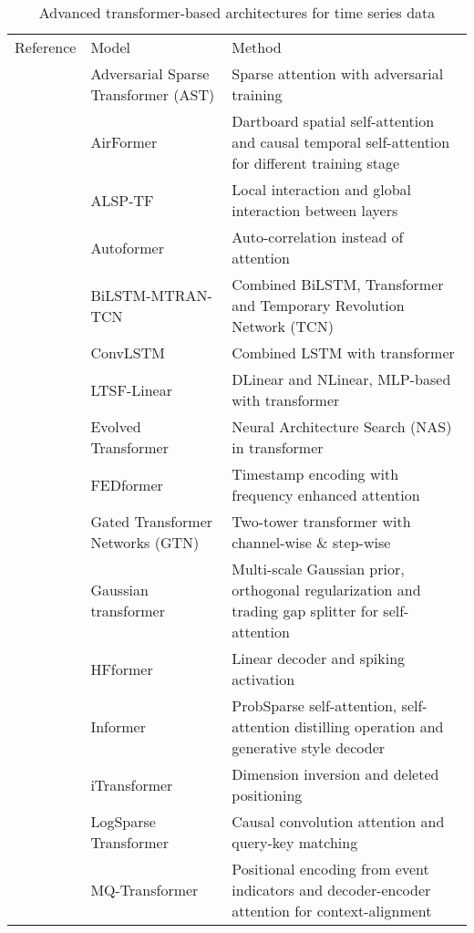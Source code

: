 \documentclass[preprint,12pt]{elsarticle}
\begin{document}
\begin{table}
\scriptsize
\caption{Advanced transformer-based architectures for time series data}
\centering
\label{transformerints}
{
\renewcommand{\arraystretch}{1}
\begin{tabular}{p{2.6cm} | p{4cm} p{7.5cm}}
\toprule
Reference & Model & Method\\
\citet{wu2020adversarial} & Adversarial Sparse Transformer (AST)  &  Sparse attention with adversarial training \\
\citet{liang2023airformer} & AirFormer  & Dartboard spatial self-attention and causal temporal self-attention for different training stage \\ 
\citet{wang2022adaptive} & ALSP-TF & Local interaction and global interaction between layers\\
\citet{wu2021autoformer} & Autoformer & Auto-correlation instead of attention \\
\citet{wang2023Bi} & BiLSTM-MTRAN-TCN & Combined BiLSTM, Transformer and Temporary Revolution Network (TCN)\\
\citet{kim2024physics} & ConvLSTM & Combined LSTM with transformer\\
\citet{zeng2023transformers} & LTSF-Linear &  DLinear and NLinear, MLP-based with transformer \\ 
\citet{so2019evolved} & Evolved Transformer & Neural Architecture Search (NAS) in transformer \\ 
\citet{zhou2022fedformer} & FEDformer &  Timestamp encoding with frequency enhanced attention\\ 
\citet{liu2021gated} & Gated Transformer Networks (GTN) & Two-tower transformer with channel-wise \& step-wise\\ 
\citet{ding2020hierarchical} & Gaussian transformer & Multi-scale Gaussian prior, orthogonal
regularization and trading gap splitter for self-attention \\ 
\citet{barez2023exploring} & HFformer & Linear decoder and spiking activation\\ 
\citet{zhou2021informer} & Informer & ProbSparse self-attention, self-attention distilling operation and generative style decoder \\  
\citet{liu2024itransformer} & iTransformer & Dimension inversion and deleted positioning \\  
\citet{li2019enhancing} & LogSparse Transformer &  Causal convolution attention and query-key matching\\ 
\citet{eisenach2020mqtransformer} & MQ-Transformer & Positional encoding from event indicators and decoder-encoder attention for context-alignment \\ 

\end{tabular}}
\end{table}
\end{document}
